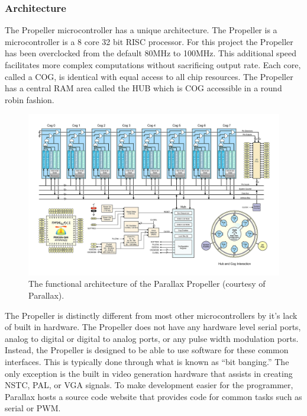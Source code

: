 \documentclass{article}
\numberwithin{equation}{section} %
\begin{document}
\subsubsection{Architecture}

The Propeller microcontroller has a unique architecture. The Propeller is a microcontroller is a 8 core 32 bit RISC processor. For this project the Propeller has been overclocked from the default 80MHz to 100MHz. This additional speed facilitates more complex computations without sacrificing output rate. Each core, called a COG, is identical with equal access to all chip resources. The Propeller has a central RAM area called the HUB which is COG accessible in a round robin fashion.

\begin{figure}[h!]
  \centering
	\includegraphics[scale=.17]{PropellerArchitecture.jpg}
  \caption{The functional architecture of the Parallax Propeller (courtesy of Parallax).}
\end{figure}  

The Propeller is distinctly different from most other microcontrollers by it's lack of built in hardware. The Propeller does not have any hardware level serial ports, analog to digital or digital to analog ports, or any pulse width modulation ports. Instead, the Propeller is designed to be able to use software for these common interfaces. This is typically done through what is known as “bit banging.” The only exception is the built in video generation hardware that assists in creating NSTC, PAL, or VGA signals. To make development easier for the programmer, Parallax hosts a source code website that provides code for common tasks such as serial or PWM.
\end{document}
